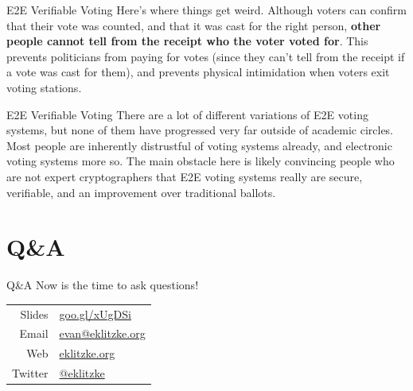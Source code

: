 \documentclass[14pt]{beamer}
\begin{document}
\begin{frame}{E2E Verifiable Voting}
  Here's where things get weird.
  \newline
  \newline
  Although voters can confirm that their vote was counted, and that it was cast
  for the right person, \textbf{other people cannot tell from the receipt who the
    voter voted for}.
  \newline
  \newline
  This prevents politicians from paying for votes (since they can't tell from
  the receipt if a vote was cast for them), and prevents physical intimidation
  when voters exit voting stations.
\end{frame}

\begin{frame}{E2E Verifiable Voting}
  There are a lot of different variations of E2E voting systems, but none of
  them have progressed very far outside of academic circles.
  \newline
  \newline
  Most people are inherently distrustful of voting systems already, and
  electronic voting systems more so.
  \newline
  \newline
  The main obstacle here is likely convincing people who are not expert
  cryptographers that E2E voting systems really are secure, verifiable, and an
  improvement over traditional ballots.
\end{frame}

\section{Q{\&}A}

\begin{frame}{Q{\&}A}
  Now is the time to ask questions!
  \vspace{10mm}
  \newline
  \begin{tabular}{r | l}
    Slides & \href{https://goo.gl/xUgDSi}{goo.gl/xUgDSi} \\
    Email & \href{mailto:evan@eklitzke.org}{evan@eklitzke.org} \\
    Web & \href{https://eklitzke.org}{eklitzke.org} \\
    Twitter & \href{https://twitter.com/eklitzke}{@eklitzke} \\
  \end{tabular}
\end{frame}
\end{document}
